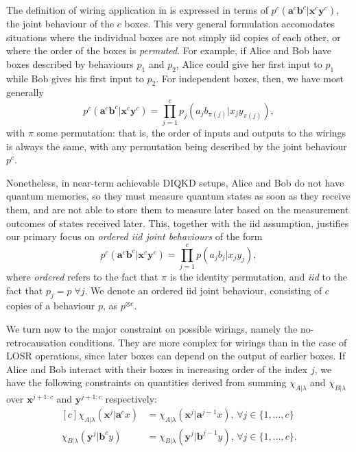 \documentclass[10pt, a4paper]{article}
\numberwithin{equation}{section} %
\theoremstyle{definition}
\theoremstyle{plain}
\newcommand{\dintv}[2]{\mathopen\{#1,\ldots,#2\mathclose\}}
\newcommand{\?}{\mathrel{?}} %
\newcommand{\cvec}[1]{\boldsymbol{\mathbf{#1}}}    %
\begin{document}
                The definition of wiring application in  is expressed in terms of \(p^c(\cvec{a}^c\cvec{b}^c|\cvec{x}^c\cvec{y}^c)\), the joint behaviour of the \(c\) boxes. This very general formulation accomodates situations where the individual boxes are not simply iid copies of each other, or where the order of the boxes is \emph{permuted}. For example, if Alice and Bob have boxes described by behaviours \(p_1\) and \(p_2\), Alice could give her first input to \(p_1\) while Bob gives his first input to \(p_2\). For independent boxes, then, we have most generally
                  \begin{equation}
                     p^c(\cvec{a}^c\cvec{b}^c|\cvec{x}^c\cvec{y}^c) = \prod_{j=1}^c p_j(a_jb_{\pi(j)}|x_jy_{\pi(j)}),
                  \end{equation}
                  with \(\pi\) some permutation: that is, the order of inputs and outputs to the wirings is always the same, with any permutation being described by the joint behaviour \(p^c\).

                  Nonetheless, in near-term achievable DIQKD setups, Alice and Bob do not have quantum memories, so they must measure quantum states as soon as they receive them, and are not able to store them to measure later based on the measurement outcomes of states received later. This, together with the iid assumption, justifies our primary focus on \emph{ordered iid joint behaviours} of the form
                  \begin{equation}
                     p^c(\cvec{a}^c\cvec{b}^c|\cvec{x}^c\cvec{y}^c) = \prod_{j=1}^c p(a_jb_j|x_jy_j),
                  \end{equation}
                  where \emph{ordered} refers to the fact that \(\pi\) is the identity permutation, and \emph{iid} to the fact that \(p_j = p\;\forall j\). We denote an ordered iid joint behaviour, consisting of \(c\) copies of a behaviour \(p\), as \(p^{\otimes c}\).

              We turn now to the major constraint on possible wirings, namely the no-retrocausation conditions. They are more complex for wirings than in the case of LOSR operations, since later boxes can depend on the output of earlier boxes. If Alice and Bob interact with their boxes in increasing order of the index \(j\), we have the following constraints on quantities derived from summing \(\chi_{A|\lambda}\) and \(\chi_{B|\lambda}\) over \(\cvec{x}^{j+1:c}\) and \(\cvec{y}^{j+1:c}\) respectively:
              \begin{equation}
                \begin{aligned}[c]
                  \chi_{A|\lambda}(\cvec{x}^j|\cvec{a}^cx) &= \chi_{A|\lambda}(\cvec{x}^j|\cvec{a}^{j-1}x),\,\forall j \in \dintv{1}{c} \\
                  \chi_{B|\lambda}(\cvec{y}^j|\cvec{b}^cy) &= \chi_{B|\lambda}(\cvec{y}^j|\cvec{b}^{j-1}y),\,\forall j \in \dintv{1}{c}.
                \end{aligned}\label{eqn:wiringnoretro}
              \end{equation}
\end{document}
